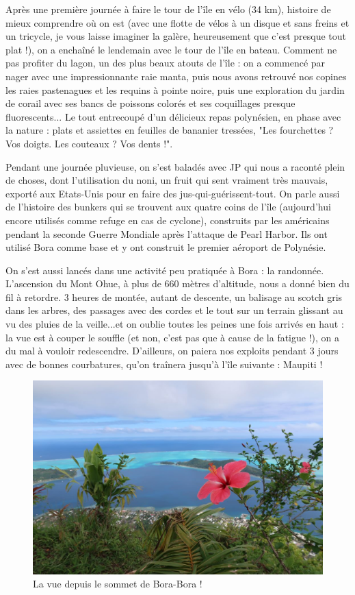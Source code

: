 Après une première journée à faire le tour de l'île en vélo (34 km),
histoire de mieux comprendre où on est (avec une flotte de vélos à un
disque et sans freins et un tricycle, je vous laisse imaginer la galère,
heureusement que c'est presque tout plat !), on a enchaîné le lendemain
avec le tour de l'île en bateau. Comment ne pas profiter du lagon, un
des plus beaux atouts de l'île : on a commencé par nager avec une
impressionnante raie manta, puis nous avons retrouvé nos copines les
raies pastenagues et les requins à pointe noire, puis une exploration du
jardin de corail avec ses bancs de poissons colorés et ses coquillages
presque fluorescents... Le tout entrecoupé d'un délicieux repas
polynésien, en phase avec la nature : plats et assiettes en feuilles de
bananier tressées, "Les fourchettes ? Vos doigts. Les couteaux ? Vos
dents !".

Pendant une journée pluvieuse, on s'est baladés avec JP qui nous a
raconté plein de choses, dont l'utilisation du noni, un fruit qui sent
vraiment très mauvais, exporté aux Etats-Unis pour en faire des
jus-qui-guérissent-tout. On parle aussi de l'histoire des bunkers qui se
trouvent aux quatre coins de l'île (aujourd'hui encore utilisés comme
refuge en cas de cyclone), construits par les américains pendant la
seconde Guerre Mondiale après l'attaque de Pearl Harbor. Ils ont utilisé
Bora comme base et y ont construit le premier aéroport de Polynésie.

On s'est aussi lancés dans une activité peu pratiquée à Bora : la
randonnée. L'ascension du Mont Ohue, à plus de 660 mètres d'altitude,
nous a donné bien du fil à retordre. 3 heures de montée, autant de
descente, un balisage au scotch gris dans les arbres, des passages avec
des cordes et le tout sur un terrain glissant au vu des pluies de la
veille...et on oublie toutes les peines une fois arrivés en haut : la
vue est à couper le souffle (et non, c'est pas que à cause de la fatigue
!), on a du mal à vouloir redescendre. D'ailleurs, on paiera nos
exploits pendant 3 jours avec de bonnes courbatures, qu'on traînera
jusqu'à l'île suivante : Maupiti !

\begin{figure}
\centering
\includegraphics{images/20180820_borarando.JPG}
\caption{La vue depuis le sommet de Bora-Bora !}
\end{figure}

